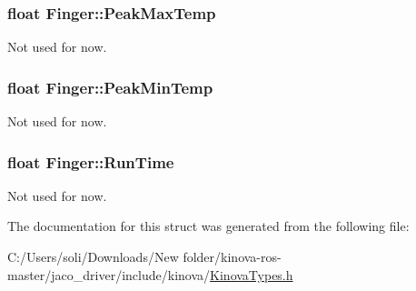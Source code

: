 \subsubsection[{\texorpdfstring{Peak\+Max\+Temp}{PeakMaxTemp}}]{\setlength{\rightskip}{0pt plus 5cm}float Finger\+::\+Peak\+Max\+Temp}\hypertarget{struct_finger_ac959db1d35ebd3ded1ba2639cb927fbc}{}\label{struct_finger_ac959db1d35ebd3ded1ba2639cb927fbc}


Not used for now. 

\subsubsection[{\texorpdfstring{Peak\+Min\+Temp}{PeakMinTemp}}]{\setlength{\rightskip}{0pt plus 5cm}float Finger\+::\+Peak\+Min\+Temp}\hypertarget{struct_finger_ada7e63fa8e1b618d198cafd472692185}{}\label{struct_finger_ada7e63fa8e1b618d198cafd472692185}


Not used for now. 

\subsubsection[{\texorpdfstring{Run\+Time}{RunTime}}]{\setlength{\rightskip}{0pt plus 5cm}float Finger\+::\+Run\+Time}\hypertarget{struct_finger_a28ad3ba61112ad6b05532edb89427684}{}\label{struct_finger_a28ad3ba61112ad6b05532edb89427684}


Not used for now. 



The documentation for this struct was generated from the following file\+:\begin{DoxyCompactItemize}
\item 
C\+:/\+Users/soli/\+Downloads/\+New folder/kinova-\/ros-\/master/jaco\+\_\+driver/include/kinova/\hyperlink{_kinova_types_8h}{Kinova\+Types.\+h}\end{DoxyCompactItemize}
